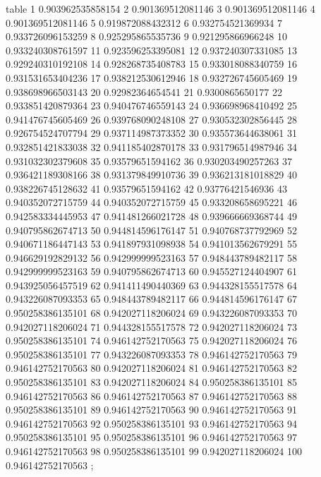 table {%
	1 0.903962535858154
	2 0.901369512081146
	3 0.901369512081146
	4 0.901369512081146
	5 0.919872088432312
	6 0.932754521369934
	7 0.933726096153259
	8 0.925295865535736
	9 0.921295866966248
	10 0.933240308761597
	11 0.923596253395081
	12 0.937240307331085
	13 0.929240310192108
	14 0.928268735408783
	15 0.933018088340759
	16 0.931531653404236
	17 0.938212530612946
	18 0.932726745605469
	19 0.938698966503143
	20 0.92982364654541
	21 0.9300865650177
	22 0.933851420879364
	23 0.940476746559143
	24 0.936698968410492
	25 0.941476745605469
	26 0.939768090248108
	27 0.930532302856445
	28 0.926754524707794
	29 0.937114987373352
	30 0.935573644638061
	31 0.932851421833038
	32 0.941185402870178
	33 0.931796514987946
	34 0.931032302379608
	35 0.93579651594162
	36 0.930203490257263
	37 0.936421189308166
	38 0.931379849910736
	39 0.936213181018829
	40 0.938226745128632
	41 0.93579651594162
	42 0.93776421546936
	43 0.940352072715759
	44 0.940352072715759
	45 0.933208658695221
	46 0.942583334445953
	47 0.941481266021728
	48 0.939666669368744
	49 0.940795862674713
	50 0.944814596176147
	51 0.940768737792969
	52 0.940671186447143
	53 0.941897931098938
	54 0.941013562679291
	55 0.946629192829132
	56 0.942999999523163
	57 0.948443789482117
	58 0.942999999523163
	59 0.940795862674713
	60 0.945527124404907
	61 0.943925056457519
	62 0.941411490440369
	63 0.944328155517578
	64 0.943226087093353
	65 0.948443789482117
	66 0.944814596176147
	67 0.950258386135101
	68 0.942027118206024
	69 0.943226087093353
	70 0.942027118206024
	71 0.944328155517578
	72 0.942027118206024
	73 0.950258386135101
	74 0.946142752170563
	75 0.942027118206024
	76 0.950258386135101
	77 0.943226087093353
	78 0.946142752170563
	79 0.946142752170563
	80 0.942027118206024
	81 0.946142752170563
	82 0.950258386135101
	83 0.942027118206024
	84 0.950258386135101
	85 0.946142752170563
	86 0.946142752170563
	87 0.946142752170563
	88 0.950258386135101
	89 0.946142752170563
	90 0.946142752170563
	91 0.946142752170563
	92 0.950258386135101
	93 0.946142752170563
	94 0.950258386135101
	95 0.950258386135101
	96 0.946142752170563
	97 0.946142752170563
	98 0.950258386135101
	99 0.942027118206024
	100 0.946142752170563
};
